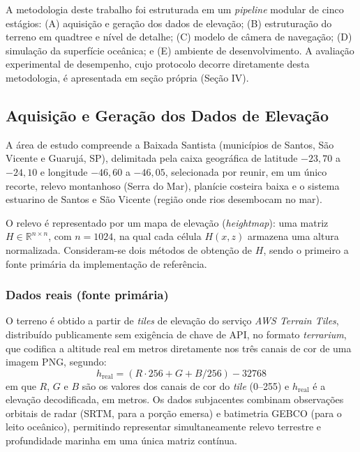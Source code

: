 \documentclass[conference]{IEEEtran}
\begin{document}
A metodologia deste trabalho foi estruturada em um \emph{pipeline}
modular de cinco estágios: (A) aquisição e geração dos dados de elevação;
(B) estruturação do terreno em quadtree e nível de detalhe; (C) modelo de
câmera de navegação; (D) simulação da superfície oceânica; e (E)
ambiente de desenvolvimento. A avaliação experimental de desempenho, cujo
protocolo decorre diretamente desta metodologia, é apresentada em seção
própria (Seção IV).

\subsection{Aquisição e Geração dos Dados de Elevação}

A área de estudo compreende a Baixada Santista (municípios de Santos, São
Vicente e Guarujá, SP), delimitada pela caixa geográfica de latitude
$-23{,}70$ a $-24{,}10$ e longitude $-46{,}60$ a $-46{,}05$, selecionada
por reunir, em um único recorte, relevo montanhoso (Serra do Mar),
planície costeira baixa e o sistema estuarino de Santos e São Vicente (região onde rios desembocam
no mar).

O relevo é representado por um mapa de elevação (\emph{heightmap}): uma
matriz $H \in \mathbb{R}^{n \times n}$, com $n = 1024$, na qual cada
célula $H(x,z)$ armazena uma altura normalizada. Consideram-se dois
métodos de obtenção de $H$, sendo o primeiro a fonte primária da
implementação de referência.

\subsubsection{Dados reais (fonte primária)}
O terreno é obtido a partir de
\emph{tiles} de elevação do serviço \emph{AWS Terrain Tiles}, distribuído
publicamente sem exigência de chave de API, no formato \emph{terrarium},
que codifica a altitude real em metros diretamente nos três canais de cor
de uma imagem PNG, segundo:
\begin{equation}
h_{\text{real}} = (R \cdot 256 + G + B/256) - 32768
\label{eq:terrarium}
\end{equation}
em que $R$, $G$ e $B$ são os valores dos canais de cor do \emph{tile}
(0--255) e $h_{\text{real}}$ é a elevação decodificada, em metros. Os
dados subjacentes combinam observações orbitais de radar (SRTM, para a
porção emersa) e batimetria GEBCO (para o leito oceânico), permitindo
representar simultaneamente relevo terrestre e profundidade marinha em
uma única matriz contínua.
\end{document}
